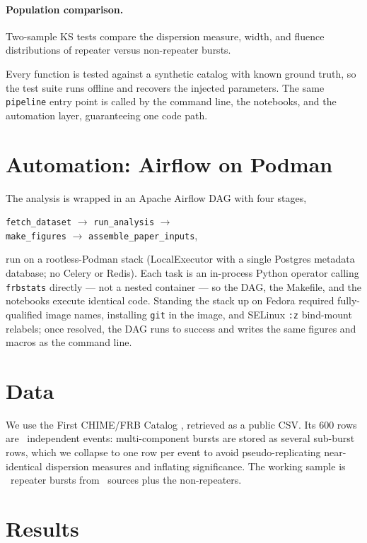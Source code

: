 \documentclass[twocolumn]{aastex631}
\newcommand{\code}[1]{\texttt{#1}}
\begin{document}
\paragraph{Population comparison.} Two-sample KS tests compare the dispersion measure,
width, and fluence distributions of repeater versus non-repeater bursts.

Every function is tested against a synthetic catalog with known ground truth, so the test
suite runs offline and recovers the injected parameters. The same \code{pipeline} entry
point is called by the command line, the notebooks, and the automation layer, guaranteeing
one code path.

\section{Automation: Airflow on Podman}
The analysis is wrapped in an Apache Airflow \citep{airflow} DAG with four stages,
\begin{center}
\code{fetch\_dataset} $\rightarrow$ \code{run\_analysis} $\rightarrow$ \\
\code{make\_figures} $\rightarrow$ \code{assemble\_paper\_inputs},
\end{center}
run on a rootless-Podman stack (LocalExecutor with a single Postgres metadata database; no
Celery or Redis). Each task is an in-process Python operator calling \code{frbstats}
directly --- not a nested container --- so the DAG, the Makefile, and the notebooks execute
identical code. Standing the stack up on Fedora required fully-qualified image names,
installing \code{git} in the image, and SELinux \code{:z} bind-mount relabels; once
resolved, the DAG runs to success and writes the same figures and macros as the command
line.

\section{Data}
We use the First CHIME/FRB Catalog \citep{chimecat1}, retrieved as a public CSV. Its 600
rows are \nBursts\ independent events: multi-component bursts are stored as several
sub-burst rows, which we collapse to one row per event to avoid pseudo-replicating
near-identical dispersion measures and inflating significance. The working sample is
\nRepeaterBursts\ repeater bursts from \nRepeaterSources\ sources plus the non-repeaters.

\section{Results}
\end{document}
